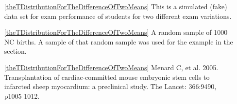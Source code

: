 \begin{itemize}
\item[\ref{theTDistributionForTheDifferenceOfTwoMeans}]
    This is a simulated (fake) data set for exam performance
    of students for two different exam variations.

\item[\ref{theTDistributionForTheDifferenceOfTwoMeans}]
    A random sample of 1000 NC births.
    A sample of that random sample was used for the example
    in the section.

\item[\ref{theTDistributionForTheDifferenceOfTwoMeans}]
        {Menard C, et al. 2005.
            Transplantation of cardiac-committed mouse embryonic
            stem cells to infarcted sheep myocardium:
            a preclinical study.
            The Lancet: 366:9490, p1005-1012.}

\end{itemize}








